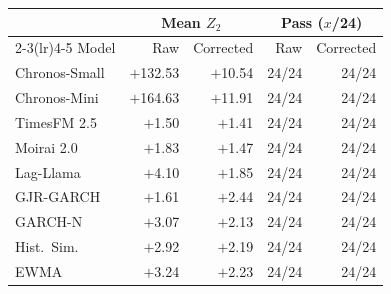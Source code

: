 \begin{tabular}{@{}l rr rr@{}}
\hline\hline
& \multicolumn{2}{c}{Mean $Z_2$}
& \multicolumn{2}{c}{Pass ($x$/24)} \\
\cmidrule(lr){2-3}\cmidrule(lr){4-5}
Model & Raw & Corrected & Raw & Corrected \\
\hline
Chronos-Small & $+$132.53 & $+$10.54 & 24/24 & 24/24 \\
Chronos-Mini & $+$164.63 & $+$11.91 & 24/24 & 24/24 \\
TimesFM 2.5 & $+$1.50 & $+$1.41 & 24/24 & 24/24 \\
Moirai 2.0 & $+$1.83 & $+$1.47 & 24/24 & 24/24 \\
Lag-Llama & $+$4.10 & $+$1.85 & 24/24 & 24/24 \\
\hline
GJR-GARCH & $+$1.61 & $+$2.44 & 24/24 & 24/24 \\
GARCH-N & $+$3.07 & $+$2.13 & 24/24 & 24/24 \\
Hist.\ Sim. & $+$2.92 & $+$2.19 & 24/24 & 24/24 \\
EWMA & $+$3.24 & $+$2.23 & 24/24 & 24/24 \\
\hline\hline
\end{tabular}
